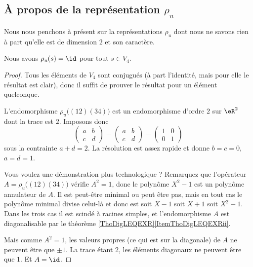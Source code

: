 \subsection{À propos de la représentation \( \rho_u\)}

Nous nous penchons à présent sur la représentations \( \rho_u\) dont nous ne savons rien à part qu'elle est de dimension \( 2\) et son caractère. 

\begin{lemma}
    Nous avons \( \rho_u(s)=\id\) pour tout \( s\in V_4\).
\end{lemma}

\begin{proof}
    Tous les éléments de \( V_4\) sont conjugués (à part l'identité, mais pour elle le résultat est clair), donc il suffit de prouver le résultat pour un élément quelconque.

    L'endomorphisme \( \rho_u\big( (12)(34) \big)\) est un endomorphisme d'ordre \( 2\) sur \( \eR^2\) dont la trace est \( 2\). Imposons donc
    \begin{equation}
        \begin{pmatrix}
            a    &   b    \\ 
            c    &   d    
        \end{pmatrix}=\begin{pmatrix}
            a    &   b    \\ 
            c    &   d    
        \end{pmatrix}=\begin{pmatrix}
            1    &   0    \\ 
            0    &   1    
        \end{pmatrix}
    \end{equation}
    sous la contrainte \( a+d=2\). La résolution est assez rapide et donne \( b=c=0\), \( a=d=1\). 

    Vous voulez une démonstration plus technologique ? Remarquez que l'opérateur \( A=\rho_u\big( (12)(34) \big)\) vérifie \( A^2=1\), donc le polynôme \( X^2-1\) est un polynôme annulateur de \( A\). Il est peut-être minimal ou peut être pas, mais en tout cas le polynôme minimal divise celui-là et donc est soit \( X-1\) soit \( X+1\) soit \( X^2-1\). Dans les trois cas il est scindé à racines simples, et l'endomorphisme \( A\) est diagonalisable par le théorème \ref{ThoDigLEQEXR}\ref{ItemThoDigLEQEXRii}.

    Mais comme \( A^2=1\), les valeurs propres (ce qui est sur la diagonale) de \( A\) ne peuvent être que \( \pm1\). La trace étant \( 2\), les éléments diagonaux ne peuvent être que \( 1\). Et \( A=\id\).
\end{proof}


